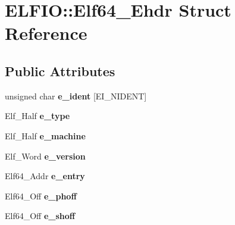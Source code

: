 \hypertarget{struct_e_l_f_i_o_1_1_elf64___ehdr}{}\section{E\+L\+F\+IO\+:\+:Elf64\+\_\+\+Ehdr Struct Reference}
\label{struct_e_l_f_i_o_1_1_elf64___ehdr}
\subsection*{Public Attributes}
\begin{DoxyCompactItemize}
\item 
unsigned char {\bfseries e\+\_\+ident} \mbox{[}E\+I\+\_\+\+N\+I\+D\+E\+NT\mbox{]}\hypertarget{struct_e_l_f_i_o_1_1_elf64___ehdr_adad6af3230e4b63e08de194627f2aacd}{}\label{struct_e_l_f_i_o_1_1_elf64___ehdr_adad6af3230e4b63e08de194627f2aacd}

\item 
Elf\+\_\+\+Half {\bfseries e\+\_\+type}\hypertarget{struct_e_l_f_i_o_1_1_elf64___ehdr_a3b558d13091be6e9d75eb489376aa071}{}\label{struct_e_l_f_i_o_1_1_elf64___ehdr_a3b558d13091be6e9d75eb489376aa071}

\item 
Elf\+\_\+\+Half {\bfseries e\+\_\+machine}\hypertarget{struct_e_l_f_i_o_1_1_elf64___ehdr_a0eb0a9202552aa71fafcafb454430315}{}\label{struct_e_l_f_i_o_1_1_elf64___ehdr_a0eb0a9202552aa71fafcafb454430315}

\item 
Elf\+\_\+\+Word {\bfseries e\+\_\+version}\hypertarget{struct_e_l_f_i_o_1_1_elf64___ehdr_ad4e3a45aeef91cbf037df1b5a4c4b78f}{}\label{struct_e_l_f_i_o_1_1_elf64___ehdr_ad4e3a45aeef91cbf037df1b5a4c4b78f}

\item 
Elf64\+\_\+\+Addr {\bfseries e\+\_\+entry}\hypertarget{struct_e_l_f_i_o_1_1_elf64___ehdr_a0690171dd079e89f6fef40edd46753f9}{}\label{struct_e_l_f_i_o_1_1_elf64___ehdr_a0690171dd079e89f6fef40edd46753f9}

\item 
Elf64\+\_\+\+Off {\bfseries e\+\_\+phoff}\hypertarget{struct_e_l_f_i_o_1_1_elf64___ehdr_a5e013ae623ac3ff2a2eaaed24d038b7c}{}\label{struct_e_l_f_i_o_1_1_elf64___ehdr_a5e013ae623ac3ff2a2eaaed24d038b7c}

\item 
Elf64\+\_\+\+Off {\bfseries e\+\_\+shoff}\hypertarget{struct_e_l_f_i_o_1_1_elf64___ehdr_a93ef221d32c6406e11328313d05cdfc3}{}\label{struct_e_l_f_i_o_1_1_elf64___ehdr_a93ef221d32c6406e11328313d05cdfc3}


\end{DoxyCompactItemize}
